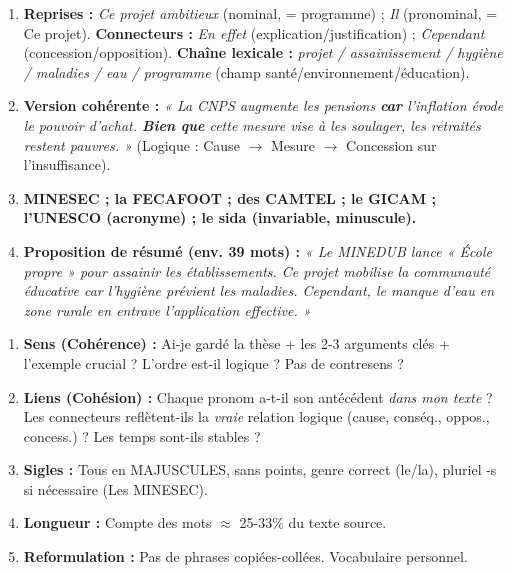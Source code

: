 \documentclass[11pt]{article}
\begin{document}
\begin{corrige}[Exercice n°1 à 4]
\begin{enumerate}
    \item \textbf{Reprises :} \emph{Ce projet ambitieux} (nominal, = programme) ; \emph{Il} (pronominal, = Ce projet). \textbf{Connecteurs :} \emph{En effet} (explication/justification) ; \emph{Cependant} (concession/opposition). \textbf{Chaîne lexicale :} \emph{projet / assainissement / hygiène / maladies / eau / programme} (champ santé/environnement/éducation).
    \item \textbf{Version cohérente :} \emph{« La CNPS augmente les pensions \textbf{car} l'inflation érode le pouvoir d'achat. \textbf{Bien que} cette mesure vise à les soulager, les retraités restent pauvres. »} (Logique : Cause $\to$ Mesure $\to$ Concession sur l'insuffisance).
    \item \textbf{MINESEC ; la FECAFOOT ; des CAMTEL ; le GICAM ; l'UNESCO (acronyme) ; le sida (invariable, minuscule).}
    \item \textbf{Proposition de résumé (env. 39 mots) :} \emph{« Le MINEDUB lance « École propre » pour assainir les établissements. Ce projet mobilise la communauté éducative car l'hygiène prévient les maladies. Cependant, le manque d'eau en zone rurale en entrave l'application effective. »}
\end{enumerate}
\end{corrige}

\begin{methode}
\begin{enumerate}
    \item \textbf{Sens (Cohérence) :} Ai-je gardé la thèse + les 2-3 arguments clés + l'exemple crucial ? L'ordre est-il logique ? Pas de contresens ?
    \item \textbf{Liens (Cohésion) :} Chaque pronom a-t-il son antécédent \emph{dans mon texte} ? Les connecteurs reflètent-ils la \emph{vraie} relation logique (cause, conséq., oppos., concess.) ? Les temps sont-ils stables ?
    \item \textbf{Sigles :} Tous en MAJUSCULES, sans points, genre correct (le/la), pluriel -s si nécessaire (Les MINESEC).
    \item \textbf{Longueur :} Compte des mots $\approx$ 25-33\% du texte source.
    \item \textbf{Reformulation :} Pas de phrases copiées-collées. Vocabulaire personnel.
\end{enumerate}
\end{methode}
\end{document}
